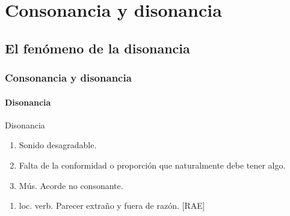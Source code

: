 \documentclass[12 pt]{beamer}
\begin{document}


\section{Consonancia y disonancia}

\subsection{El fenómeno de la disonancia}

\begin{frame}{7}
    \frametitle{Consonancia y disonancia}
    
    \framesubtitle{Disonancia}
    
    \begin{alertblock}{Disonancia}
    
        \begin{enumerate}
            \item Sonido desagradable.
            \item  Falta de la conformidad o proporción que naturalmente debe tener algo.
            \item Mús. Acorde no consonante.
        \end{enumerate}
        \begin{enumerate}
            \item loc. verb.  Parecer extraño y fuera de razón.
            [RAE]
        \end{enumerate}
        
    \end{alertblock}
    
\end{frame}


    
    
    
\end{document}
